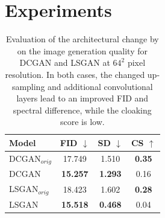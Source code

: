 \documentclass[letterpaper]{article} %
\begin{document}

\section{Experiments}
\label{sec:experiments}
\begin{table}
    \caption{Evaluation of the architectural change by \citet{margret2020upconvolution} on the image generation quality for DCGAN and LSGAN at $64^2$ pixel resolution. In both cases, the changed up-sampling and additional convolutional layers lead to an improved FID and spectral difference, while the cloaking score is low.}
    \centering
    \begin{tabular}{l c c c}
        \toprule
         Model & FID $\downarrow$ & SD $\downarrow$ & CS $\uparrow$ \\
        \midrule
DCGAN$_{orig}$ & 17.749 & 1.510 & {\bf 0.35} \\
DCGAN &{\bf 15.257} &{\bf 1.293} & 0.16\\
LSGAN$_{orig}$&18.423&1.602&{\bf 0.28}\\
LSGAN& {\bf 15.518} & {\bf 0.468} & 0.04\\
\bottomrule
    \end{tabular}
    \label{tab:taborig}
\end{table}
\end{document}
